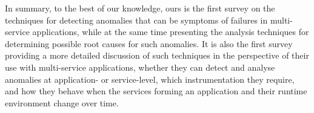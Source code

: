 In summary, to the best of our knowledge, ours is the first survey on the techniques for detecting anomalies that can be symptoms of failures in multi-service applications, while at the same time presenting the analysis techniques for determining possible root causes for such anomalies.
It is also the first survey providing a more detailed discussion of such techniques in the perspective of their use with multi-service applications, \eg whether they can detect and analyse anomalies at application- or service-level, which instrumentation they require, and how they behave when the services forming an application and their runtime environment change over time.